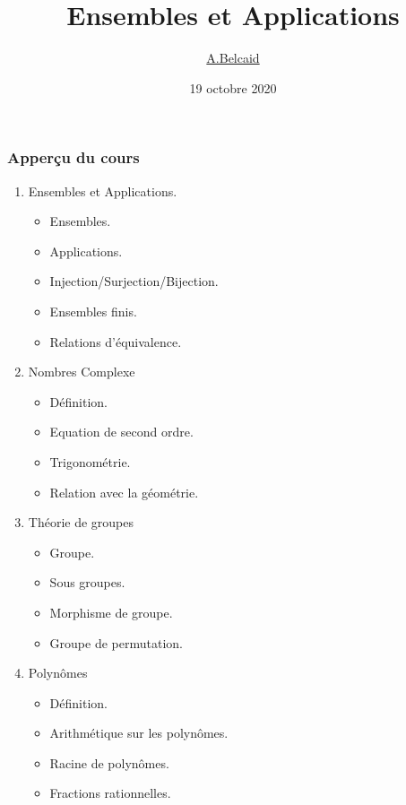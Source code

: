 \documentclass{beamer}
\title{Ensembles et Applications}
\author{\underline{A.Belcaid}}
\institute{\small Université Euro Méditerranéenne de Fès}
\date{19 octobre 2020}
\begin{document}
\maketitle

\begin{frame}[t]
  \frametitle{Apperçu du cours}
  \begin{enumerate}
    \item Ensembles et Applications.
      \begin{itemize}
        \scriptsize
        \item Ensembles.
        \item Applications.
        \item Injection/Surjection/Bijection.
        \item Ensembles finis.
        \item Relations d'équivalence.
      \end{itemize}
    \item Nombres Complexe
      \begin{itemize}
        \scriptsize
        \item Définition.
        \item Equation de second ordre.
        \item Trigonométrie.
        \item Relation avec la géométrie.
      \end{itemize}
    \item Théorie de groupes
      \begin{itemize}
        \scriptsize
        \item Groupe.
        \item Sous groupes.
        \item Morphisme de groupe.
        \item Groupe de permutation.
      \end{itemize}
    \item Polynômes
      \begin{itemize}
        \scriptsize
        \item Définition.
        \item Arithmétique sur les polynômes.
        \item Racine de polynômes.
        \item Fractions rationnelles.
      \end{itemize}
  \end{enumerate} 
\end{frame}
\end{document}
